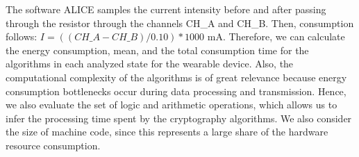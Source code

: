 
The software ALICE samples the current intensity before and after passing through the resistor through the channels CH\_A and CH\_B. Then, consumption follows: $ I = ((CH\_A - CH\_B) / 0.10) * 1000 $ mA. Therefore, %
we can %
calculate the energy consumption, mean, and the total consumption time for the algorithms in each analyzed state for the wearable device. %
%
%
Also, the computational complexity of the algorithms is of great relevance because energy consumption bottlenecks occur during data processing and transmission. Hence,  
%
%
we also evaluate the set of logic and arithmetic operations, which allows us to infer the processing time spent by the cryptography algorithms. We also consider %
the size of machine code, since this represents a large share of the hardware resource consumption.
